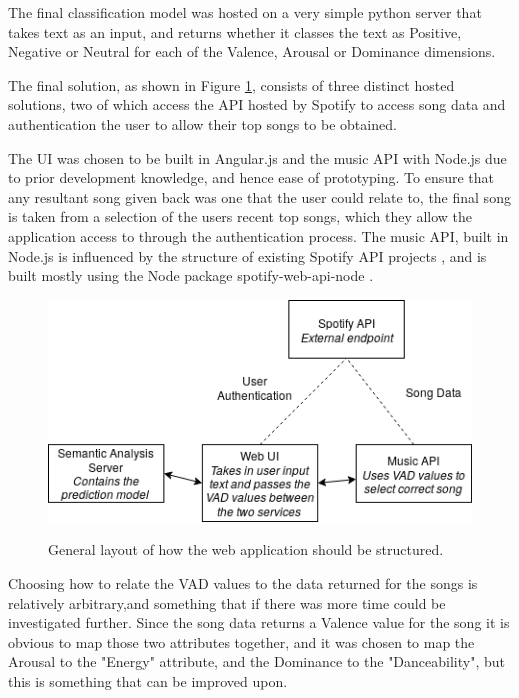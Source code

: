 The final classification model was hosted on a very simple python server that takes text as an input, and returns whether it classes the text as Positive, Negative or Neutral for each of the Valence, Arousal or Dominance dimensions. 

The final solution, as shown in Figure \ref{implementationLayout}, consists of three distinct hosted solutions, two of which access the API hosted by Spotify to access song data and authentication the user to allow their top songs to be obtained.

The UI was chosen to be built in Angular.js and the music API with Node.js due to prior development knowledge, and hence ease of prototyping. 
To ensure that any resultant song given back was one that the user could relate to, the final song is taken from a selection of the users recent top songs, which they allow the application access to through the authentication process.
The music API, built in Node.js is influenced by the structure of existing Spotify API projects \cite{moodtape}, and is built mostly using the Node package spotify-web-api-node \cite{nodeSpotify}.

\begin{figure}[ht]
\caption{General layout of how the web application should be structured.}
\centering
\includegraphics[scale=0.6]{litImgs/interfaceLayout.png}
\label{implementationLayout}
\end{figure}

Choosing how to relate the VAD values to the data returned for the songs is relatively arbitrary,and something that if there was more time could be investigated further. Since the song data returns a Valence value for the song it is obvious to map those two attributes together, and it was chosen to map the Arousal to the "Energy" attribute, and the Dominance to the "Danceability", but this is something that can be improved upon.

